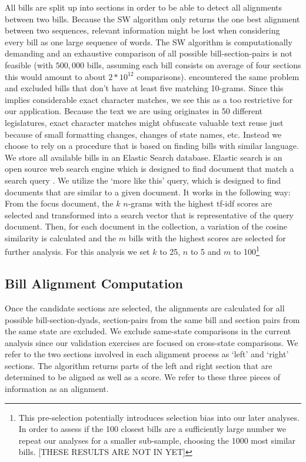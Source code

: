 \documentclass[12pt]{article} %
\begin{document}
All bills are split up into sections in order to be able to detect all alignments between two bills. Because the SW algorithm only returns the one best alignment between two sequences, relevant information might be lost when considering every bill as one large sequence of words. 
The SW algorithm is computationally demanding and an exhaustive comparison of all possible bill-section-pairs is not feasible (with $500,000$ bills, assuming each bill consists on average of four sections this would amount to about $2 * 10^{12}$ comparisons). \citet{wilkerson2015tracing} encountered the same problem and excluded bills that don't have at least five matching 10-grams. Since this implies considerable exact character matches, we see this as a too restrictive for our application. Because the text we are using originates in 50 different legislatures, exact character matches might obfuscate valuable text reuse just because of small formatting changes, changes of state names, etc. 
Instead we choose to rely on a procedure that is based on finding bills with similar language. We store all available bills in an Elastic Search database. Elastic search is an open source web search engine which is designed to find document that match a search query \citep{gormley2015elasticsearch}. We utilize the `more like this' query, which is designed to find documents that are similar to a given document. It works in the following way: From the focus document, the $k$ $n$-grams with the highest tf-idf scores are selected and transformed into a search vector that is representative of the query document. Then, for each document in the collection, a variation of the cosine similarity is calculated and the $m$ bills with the highest scores are selected for further analysis. For this analysis we set $k$ to 25, $n$ to 5 and $m$ to 100\footnote{This pre-selection potentially introduces selection bias into our later analyses. In order to assess if the 100 closest bills are a sufficiently large number we repeat our analyses for a smaller sub-sample, choosing the 1000 most similar bills. [THESE RESULTS ARE NOT IN YET]}

\subsection{Bill Alignment Computation}

Once the candidate sections are selected, the alignments are calculated for all possible bill-section-dyads, section-pairs from the same bill and section pairs from the same state are excluded. We exclude same-state comparisons in the current analysis since our validation exercises are focused on cross-state comparisons. We refer to the two sections involved in each alignment process as `left' and `right' sections. The algorithm returns parts of the left and right section that are determined to be aligned as well as a score. We refer to these three pieces of information as an alignment. 
\end{document}
